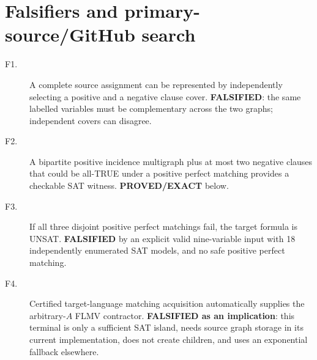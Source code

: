\documentclass[11pt]{article}
\begin{document}
\section{Falsifiers and primary-source/GitHub search}
\begin{description}
\item[F1.] A complete source assignment can be represented by independently selecting a positive and a negative clause cover. \textbf{FALSIFIED}: the same labelled variables must be complementary across the two graphs; independent covers can disagree.
\item[F2.] A bipartite positive incidence multigraph plus at most two negative clauses that could be all-TRUE under a positive perfect matching provides a checkable SAT witness. \textbf{PROVED/EXACT} below.
\item[F3.] If all three disjoint positive perfect matchings fail, the target formula is UNSAT. \textbf{FALSIFIED} by an explicit valid nine-variable input with 18 independently enumerated SAT models, and no safe positive perfect matching.
\item[F4.] Certified target-language matching acquisition automatically supplies the arbitrary-$A$ FLMV contractor. \textbf{FALSIFIED as an implication}: this terminal is only a sufficient SAT island, needs source graph storage in its current implementation, does not create children, and uses an exponential fallback elsewhere.
\end{description}
\end{document}
